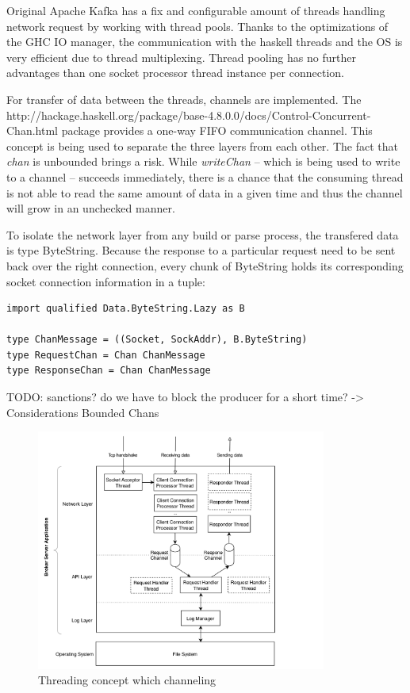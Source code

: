 Original Apache Kafka has a fix and configurable amount of threads
handling network request by working with thread pools. Thanks to the
optimizations of the GHC IO manager, the communication with the haskell threads
and the OS is very efficient due to thread multiplexing. Thread pooling has no
further advantages than one socket processor thread instance per connection. 

For transfer of data between the threads, channels are implemented. The 
{http://hackage.haskell.org/package/base-4.8.0.0/docs/Control-Concurrent-Chan.html}
package provides a one-way FIFO communication channel. This concept
is being used to separate the three layers from each other. The
fact that \textit{chan} is unbounded brings a risk. While \textit{writeChan} --
which is being used to write to a channel -- succeeds immediately, there is a
chance that the consuming thread is not able to read the same amount of data in
a given time and thus the channel will grow in an unchecked manner.
\cite{o2008real}

To isolate the network layer from any build or parse process, the transfered
data is type ByteString. Because the response to a particular request need to be
sent back over the right connection, every chunk of ByteString holds its corresponding
socket connection information in a tuple:

\begin{lstlisting}[caption={Initialize channels for threading}]
import qualified Data.ByteString.Lazy as B

type ChanMessage = ((Socket, SockAddr), B.ByteString)
type RequestChan = Chan ChanMessage
type ResponseChan = Chan ChanMessage
\end{lstlisting}

TODO: sanctions? do we have to block the producer for a short time? ->
Considerations Bounded Chans

\begin{figure}[H]
    \centering
    \includegraphics[width=0.85\textwidth]{images/impl-brok-threading.png}
    \caption{Threading concept which channeling}
    \label{fig:impl-brok-threading}
\end{figure}

